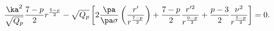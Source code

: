 \begin{equation}
\frac{\ka^2}{\sqrt{Q_p}}\frac{7-p}{2} r^{\frac{5-p}{2}} - \sqrt{Q_p}
\left[ 2\frac{\pa}{\pa\sigma}\left(\frac{r'}{r^{\frac{7-p}{2}}}\right)
+ \frac{7-p}{2}\frac{r'^2}{r^{\frac{9-p}{2}}} + \frac{p-3}{2}
\frac{\nu^2}{r^{\frac{5-p}{2}}} \right] = 0.
\end{equation}

